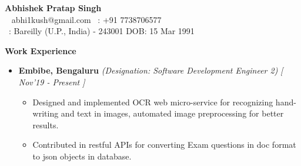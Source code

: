 \documentclass[a4paper,10pt]{article}
\newcommand{\resheading}[1]{{\small \colorbox{mygrey}{\begin{minipage}{0.988\textwidth}{\textbf{ \vphantom{p\^{E}} \large #1}}\end{minipage}}}}
\begin{document}
\textbf{\large{Abhishek Pratap Singh}}\\
\vspace{.1cm}
\indent \Letter ~ abhi1kush@gmail.com \kern 6pc \hfill \phone ~: +91 7738706577 \\
\faHome ~: \indent Bareilly (U.P., India) - 243001 \hfill DOB:
15 Mar 1991

\vspace{0.1cm}
\smallskip
\resheading{Work Experience}
\vspace{-0.4cm}
\begin{itemize}
\item \textbf{Embibe, Bengaluru} 
\emph{(Designation: Software Development Engineer 2)} \hfill {\emph{[ Nov'19 - Present ]}} \\[-0.6cm]
\begin{itemize}
\item Designed and implemented OCR web micro-service for recognizing hand-writing and text in images, automated image preprocessing for better results.
\item Contributed in restful APIs for converting Exam questions in doc format to json objects in database.   
\end{itemize}
\end{itemize}
\end{document}
